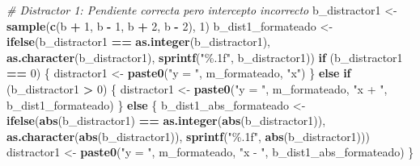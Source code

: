 \documentclass[
]{article}
\newenvironment{Shaded}{\begin{snugshade}}{\end{snugshade}}
\newcommand{\CommentTok}[1]{\textcolor[rgb]{0.56,0.35,0.01}{\textit{#1}}}
\newcommand{\ControlFlowTok}[1]{\textcolor[rgb]{0.13,0.29,0.53}{\textbf{#1}}}
\newcommand{\DecValTok}[1]{\textcolor[rgb]{0.00,0.00,0.81}{#1}}
\newcommand{\FunctionTok}[1]{\textcolor[rgb]{0.13,0.29,0.53}{\textbf{#1}}}
\newcommand{\NormalTok}[1]{#1}
\newcommand{\OtherTok}[1]{\textcolor[rgb]{0.56,0.35,0.01}{#1}}
\newcommand{\SpecialCharTok}[1]{\textcolor[rgb]{0.81,0.36,0.00}{\textbf{#1}}}
\newcommand{\StringTok}[1]{\textcolor[rgb]{0.31,0.60,0.02}{#1}}
\begin{document}
\begin{Shaded}
\begin{Highlighting}[]
  \CommentTok{\# Distractor 1: Pendiente correcta pero intercepto incorrecto}
\NormalTok{  b\_distractor1 }\OtherTok{\textless{}{-}} \FunctionTok{sample}\NormalTok{(}\FunctionTok{c}\NormalTok{(b }\SpecialCharTok{+} \DecValTok{1}\NormalTok{, b }\SpecialCharTok{{-}} \DecValTok{1}\NormalTok{, b }\SpecialCharTok{+} \DecValTok{2}\NormalTok{, b }\SpecialCharTok{{-}} \DecValTok{2}\NormalTok{), }\DecValTok{1}\NormalTok{)}
\NormalTok{  b\_dist1\_formateado }\OtherTok{\textless{}{-}} \FunctionTok{ifelse}\NormalTok{(b\_distractor1 }\SpecialCharTok{==} \FunctionTok{as.integer}\NormalTok{(b\_distractor1), }
                               \FunctionTok{as.character}\NormalTok{(b\_distractor1), }
                               \FunctionTok{sprintf}\NormalTok{(}\StringTok{"\%.1f"}\NormalTok{, b\_distractor1))}
  \ControlFlowTok{if}\NormalTok{ (b\_distractor1 }\SpecialCharTok{==} \DecValTok{0}\NormalTok{) \{}
\NormalTok{    distractor1 }\OtherTok{\textless{}{-}} \FunctionTok{paste0}\NormalTok{(}\StringTok{"y = "}\NormalTok{, m\_formateado, }\StringTok{"x"}\NormalTok{)}
\NormalTok{  \} }\ControlFlowTok{else} \ControlFlowTok{if}\NormalTok{ (b\_distractor1 }\SpecialCharTok{\textgreater{}} \DecValTok{0}\NormalTok{) \{}
\NormalTok{    distractor1 }\OtherTok{\textless{}{-}} \FunctionTok{paste0}\NormalTok{(}\StringTok{"y = "}\NormalTok{, m\_formateado, }\StringTok{"x + "}\NormalTok{, b\_dist1\_formateado)}
\NormalTok{  \} }\ControlFlowTok{else}\NormalTok{ \{}
\NormalTok{    b\_dist1\_abs\_formateado }\OtherTok{\textless{}{-}} \FunctionTok{ifelse}\NormalTok{(}\FunctionTok{abs}\NormalTok{(b\_distractor1) }\SpecialCharTok{==} \FunctionTok{as.integer}\NormalTok{(}\FunctionTok{abs}\NormalTok{(b\_distractor1)), }
                                     \FunctionTok{as.character}\NormalTok{(}\FunctionTok{abs}\NormalTok{(b\_distractor1)), }
                                     \FunctionTok{sprintf}\NormalTok{(}\StringTok{"\%.1f"}\NormalTok{, }\FunctionTok{abs}\NormalTok{(b\_distractor1)))}
\NormalTok{    distractor1 }\OtherTok{\textless{}{-}} \FunctionTok{paste0}\NormalTok{(}\StringTok{"y = "}\NormalTok{, m\_formateado, }\StringTok{"x {-} "}\NormalTok{, b\_dist1\_abs\_formateado)}
\NormalTok{  \}}
  

\end{Highlighting}
\end{Shaded}
\end{document}
